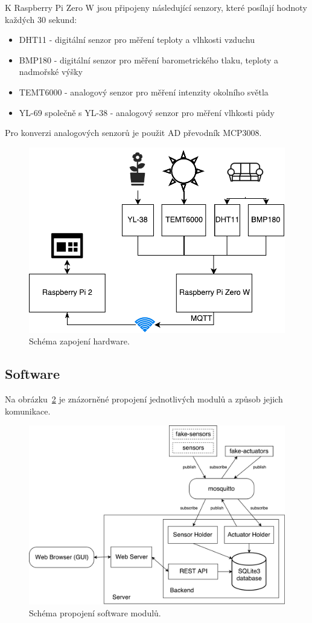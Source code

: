 \documentclass[11pt,a4paper]{article}
\begin{document}
K Raspberry Pi Zero W jsou připojeny následující senzory, které posílají hodnoty každých 30 sekund:

\begin{itemize}
    \item DHT11 - digitální senzor pro měření teploty a vlhkosti vzduchu
    \item BMP180 - digitální senzor pro měření barometrického tlaku, teploty a nadmořské výšky
    \item TEMT6000 - analogový senzor pro měření intenzity okolního světla
    \item YL-69 společně s YL-38 - analogový senzor pro měření vlhkosti půdy
\end{itemize}
Pro konverzi analogových senzorů je použit AD převodník MCP3008.

\begin{figure}[htb]
    \centering
    \includegraphics[width=0.5\linewidth]{weather-station-scheme}
    \caption{Schéma zapojení hardware.}
    \label{fig:hw-scheme}
\end{figure}

\subsection{Software}\label{subsec:sw}
Na obrázku~\ref{fig:sw-scheme} je znázorněné propojení jednotlivých modulů a způsob jejich komunikace.

\begin{figure}[htb]
    \centering
    \includegraphics[width=0.75\linewidth]{sw-scheme}
    \caption{Schéma propojení software modulů.}
    \label{fig:sw-scheme}
\end{figure}
\end{document}
